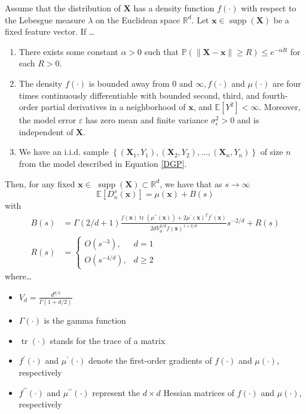 \documentclass[letterpaper,10pt]{article}
\numberwithin{equation}{section}
\numberwithin{theorem}{section}
\theoremstyle{definition}
\newcommand{\1}{\mathbb{1}}
\begin{document}
\vspace{0.5cm}
\begin{theorem}\label{demirkaya_Thm1}
	Assume that the distribution of $\mathbf{X}$ has a density function $f(\cdot)$ with respect to the Lebesgue measure $\lambda$ on the Euclidean space $\mathbb{R}^d$.
	Let $\mathbf{x} \in \operatorname{supp}(\mathbf{X})$ be a fixed feature vector.
	If \dots
	\begin{enumerate}
		\item There exists some constant $\alpha>0$ such that $\mathbb{P}(\|\mathbf{X}-\mathbf{x}\| \geq R) \leq e^{-\alpha R}$ for each $R>0$.
		\item The density $f(\cdot)$ is bounded away from 0 and $\infty, f(\cdot)$ and $\mu(\cdot)$ are four times continuously differentiable with bounded second, third, and fourth-order partial derivatives in a neighborhood of $\mathbf{x}$, and $\mathbb{E}[Y^2]<\infty$.
		      Moreover, the model error $\varepsilon$ has zero mean and finite variance $\sigma_\epsilon^2>0$ and is independent of $\mathbf{X}$.
		\item We have an i.i.d. sample $\left\{\left(\mathbf{X}_1, Y_1\right),\left(\mathbf{X}_2, Y_2\right), \dotsc,\left(\mathbf{X}_n, Y_n\right)\right\}$ of size $n$ from the model described in Equation \ref{DGP}.
	\end{enumerate}
	Then, for any fixed $\mathbf{x} \in$ $\operatorname{supp}(\mathbf{X}) \subset \mathbb{R}^d$, we have that as $s \rightarrow \infty$
	\begin{equation}
		\mathbb{E}\left[D_n^{s}(\mathbf{x})\right] = \mu(\mathbf{x})+B(s)
	\end{equation}
	with
	\begin{align*}
		B(s) & =\Gamma(2 / d+1) \frac{f(\mathbf{x}) \operatorname{tr}\left(\mu^{\prime \prime}(\mathbf{x})\right)+2 \mu^{\prime}(\mathbf{x})^T f^{\prime}(\mathbf{x})}{2 d V_d^{2 / d} f(\mathbf{x})^{1+2 / d}} s^{-2 / d}+R(s) \\
		R(s) & = \begin{cases}O\left(s^{-3}\right),     & d=1      \\
             O\left(s^{-4 / d}\right), & d \geq 2\end{cases}
	\end{align*}
	where\dots
	\begin{multicols*}{2}
		\begin{itemize}
			\item $V_d=\frac{d^{d / 2}}{\Gamma(1+d / 2)}$
			\item $\Gamma(\cdot)$ is the gamma function
			\item $\operatorname{tr}(\cdot)$ stands for the trace of a matrix
			\item $f^{\prime}(\cdot)$ and $\mu^{\prime}(\cdot)$ denote the first-order gradients of $f(\cdot)$ and $\mu(\cdot)$, respectively
			\item $f^{\prime \prime}(\cdot)$ and $\mu^{\prime \prime}(\cdot)$ represent the $d \times d$ Hessian matrices of $f(\cdot)$ and $\mu(\cdot)$, respectively
		\end{itemize}
	\end{multicols*}
\end{theorem}
\end{document}
